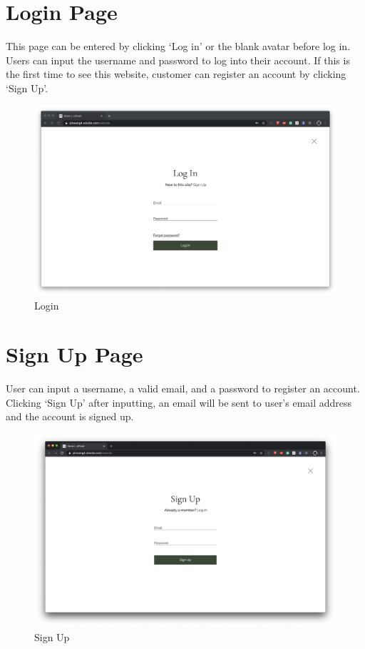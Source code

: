 \section*{Login Page}
This page can be entered by clicking ‘Log in’ or the blank avatar before log in. Users can input the username and password to log into their account. If this is the first time to see this website, customer can register an account by clicking ‘Sign Up’.
\begin{figure}[htp]
\centering
\includegraphics[width=\textwidth]{Figures/login.png}
\caption{Login}
\label{fig:login}
\end{figure}

\clearpage
\section*{Sign Up Page}
User can input a username, a valid email, and a password to register an account. Clicking ‘Sign Up’ after inputting, an email will be sent to user’s email address and the account is signed up.
\begin{figure}[htp]
\centering
\includegraphics[width=\textwidth]{Figures/signup.png}
\caption{Sign Up}
\label{fig:signup}
\end{figure}

